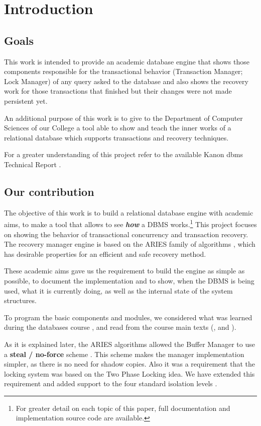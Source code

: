 \section{Introduction}

\subsection{Goals}

This work is intended to provide an academic database engine that shows those components responsible for the transactional behavior (Transaction Manager; Lock Manager) of any query asked to the database and also shows the recovery work for those transactions that finished but their changes were not made persistent yet.

An additional purpose of this work is to give to the Department of Computer Sciences \cite{FCENDC} of our College \cite{FCEN} a tool able to show and teach the inner works of a relational database which supports transactions and recovery techniques.

For a greater understanding of this project refer to the available Kanon dbms Technical Report \cite{LBCP07b}.

\subsection{Our contribution}

The objective of this work is to build a relational database engine with academic aims, to make a tool that allows to see \textbf{\textit {how}} a DBMS works.\footnote{For greater detail on each topic of this paper, full documentation and implementation source code are available.} This project focuses on showing the behavior of transactional concurrency and transaction recovery. The recovery manager engine is based on the ARIES family of algorithms \cite {MHLPS89}, which has desirable properties for an efficient and safe recovery method.

These academic aims gave us the requirement to build the engine as simple as possible, to document the implementation and to show, when the DBMS is being used, what it is currently doing, as well as the internal state of the system structures.

To program the basic components and modules, we considered what was learned during the databases course \cite{FCENBD}, and read from the course main texts (\cite{RaGh03}, \cite{Ullm88} and \cite{BeHG87}).

As it is explained later, the ARIES algorithms allowed the Buffer Manager to use a \textbf{steal / no-force} scheme \cite{RaGh03}. This scheme makes the manager implementation simpler, as there is no need for shadow copies.  Also it was a requirement that the locking system was based on the Two Phase Locking idea. We have extended this requirement and added support to the four standard isolation levels \cite{WIISLE}.

